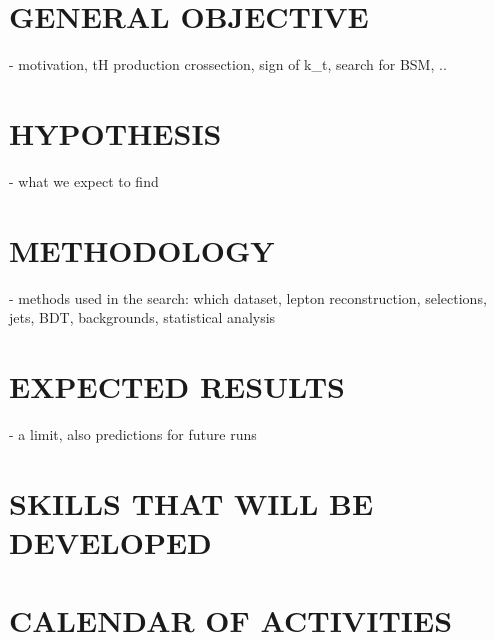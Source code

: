 \documentclass[final,3p]{CSP}
\begin{document}
\section{GENERAL OBJECTIVE}
- motivation, tH production crossection, sign of k_t, search for BSM, ..


\section{HYPOTHESIS}
- what we expect to find

\section{METHODOLOGY}
- methods used in the search: which dataset,  lepton reconstruction, selections, jets, BDT, backgrounds, statistical analysis

\section{EXPECTED RESULTS}
- a limit, also predictions for future runs


\cleardoublepage



\appendix
\section{SKILLS THAT WILL BE DEVELOPED}

\section{CALENDAR OF ACTIVITIES}
\end{document}
